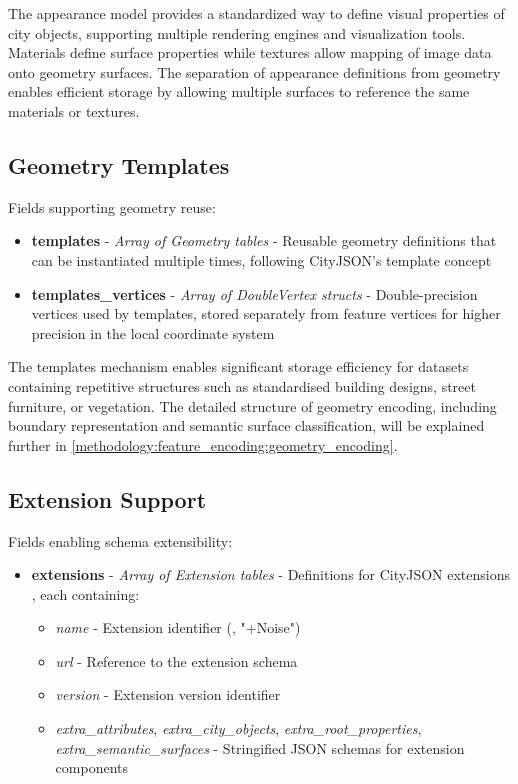 The appearance model provides a standardized way to define visual properties of city objects, supporting multiple rendering engines and visualization tools. Materials define surface properties while textures allow mapping of image data onto geometry surfaces. The separation of appearance definitions from geometry enables efficient storage by allowing multiple surfaces to reference the same materials or textures.

\subsection{Geometry Templates}
\label{methodology:header:geometry_templates}

Fields supporting geometry reuse:

\begin{itemize}
  \item \textbf{templates} - \textit{Array of Geometry tables} - Reusable geometry definitions that can be instantiated multiple times, following CityJSON's template concept \citep{cityjson_spec}

  \item \textbf{templates\_vertices} - \textit{Array of DoubleVertex structs} - Double-precision vertices used by templates, stored separately from feature vertices for higher precision in the local coordinate system \citep{cityjson_spec}
\end{itemize}

The templates mechanism enables significant storage efficiency for datasets containing repetitive structures such as standardised building designs, street furniture, or vegetation. The detailed structure of geometry encoding, including boundary representation and semantic surface classification, will be explained further in \autoref{methodology:feature_encoding:geometry_encoding}.

\subsection{Extension Support}
\label{methodology:header:extensions}

Fields enabling schema extensibility:

\begin{itemize}
  \item \textbf{extensions} - \textit{Array of Extension tables} - Definitions for CityJSON extensions \citep{cityjson_spec}, each containing:
    \begin{itemize}
      \item \textit{name} - Extension identifier (\eg, "+Noise")
      \item \textit{url} - Reference to the extension schema
      \item \textit{version} - Extension version identifier
      \item \textit{extra\_attributes}, \textit{extra\_city\_objects}, \textit{extra\_root\_properties}, \textit{extra\_semantic\_surfaces} - Stringified JSON schemas for extension components
    \end{itemize}
\end{itemize}

